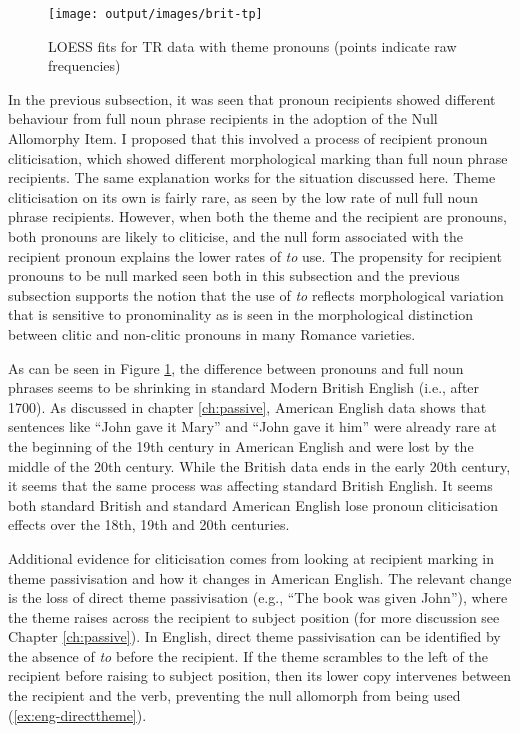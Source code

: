 	\begin{figure}[ht!]
		\texttt{[image: output/images/brit-tp]}
		\caption{LOESS fits for TR data with theme pronouns (points indicate raw frequencies)}
		\label{fig:brit-tp}
	\end{figure}

	In the previous subsection, it was seen that pronoun recipients showed different behaviour from full noun phrase recipients in the adoption of the Null Allomorphy Item. I proposed that this involved a process of recipient pronoun cliticisation, which showed different morphological marking than full noun phrase recipients. The same explanation works for the situation discussed here. Theme cliticisation on its own is fairly rare, as seen by the low rate of null full noun phrase recipients. However, when both the theme and the recipient are pronouns, both pronouns are likely to cliticise, and the null form associated with the recipient pronoun explains the lower rates of \textit{to} use. The propensity for recipient pronouns to be null marked seen both in this subsection and the previous subsection supports the notion that the use of \textit{to} reflects morphological variation that is sensitive to pronominality as is seen in the morphological distinction between clitic and non-clitic pronouns in many Romance varieties.

	As can be seen in Figure \ref{fig:brit-tp}, the difference between pronouns and full noun phrases seems to be shrinking in standard Modern British English (i.e., after 1700). As discussed in chapter \ref{ch:passive}, American English data shows that sentences like ``John gave it Mary'' and ``John gave it him'' were already rare at the beginning of the 19th century in American English and were lost by the middle of the 20th century. While the British data ends in the early 20th century, it seems that the same process was affecting standard British English. It seems both standard British and standard American English lose pronoun cliticisation effects over the 18th, 19th and 20th centuries.

	Additional evidence for cliticisation comes from looking at recipient marking in theme passivisation and how it changes in American English. The relevant change is the loss of direct theme passivisation (e.g., ``The book was given John''), where the theme raises across the recipient to subject position (for more discussion see Chapter \ref{ch:passive}). In English, direct theme passivisation can be identified by the absence of \textit{to} before the recipient. If the theme scrambles to the left of the recipient before raising to subject position, then its lower copy intervenes between the recipient and the verb, preventing the null allomorph from being used (\ref{ex:eng-directtheme}).

